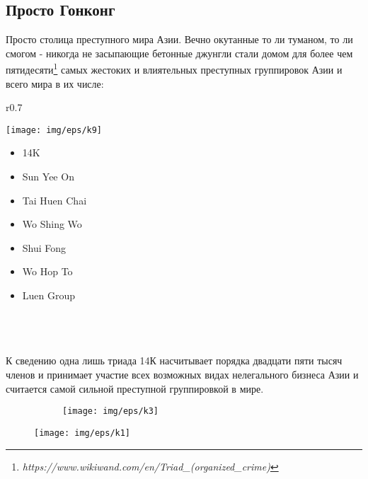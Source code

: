 \documentclass[11pt]{report}
\newenvironment{wrapfigure*}%
 {%
  \setlength{\columnsep}{15pt}%
  \wrapfloat{figure}}%
 {\endwrapfloat}
\begin{document}
\subsection{Просто Гонконг}
Просто столица преступного мира Азии. Вечно окутанные то ли туманом, то ли смогом - никогда не засыпающие бетонные джунгли стали домом для более чем пятидесяти\footnote{\emph{https://www.wikiwand.com/en/Triad\_(organized\_crime)}} самых жестоких и влиятельных преступных группировок Азии и всего мира в их числе:
\setlength{\columnsep}{5pt}
\begin{wrapfigure*}[5]{r}{0.7\linewidth}
	\centering
	\begin{center}
		\texttt{[image: img/eps/k9]}
	\end{center}
\end{wrapfigure*}
\begin{itemize}
\item 14K
\item Sun Yee On
\item Tai Huen Chai
\item Wo Shing Wo
\item Shui Fong
\item Wo Hop To
\item Luen Group
\\ \\ \\ \\
\end{itemize}
К сведению одна лишь триада 14К насчитывает порядка двадцати пяти тысяч членов и принимает участие всех возможных видах нелегального бизнеса Азии и считается самой сильной преступной группировкой в мире. 
\begin{center}
	\begin{figure}[h]
		\begin{subfigure}{.82\linewidth}
			\texttt{[image: img/eps/k3]}
		\end{subfigure}
	\end{figure}
\end{center}

\begin{figure}
	\centering
	\texttt{[image: img/eps/k1]}
\end{figure}
\end{document}
